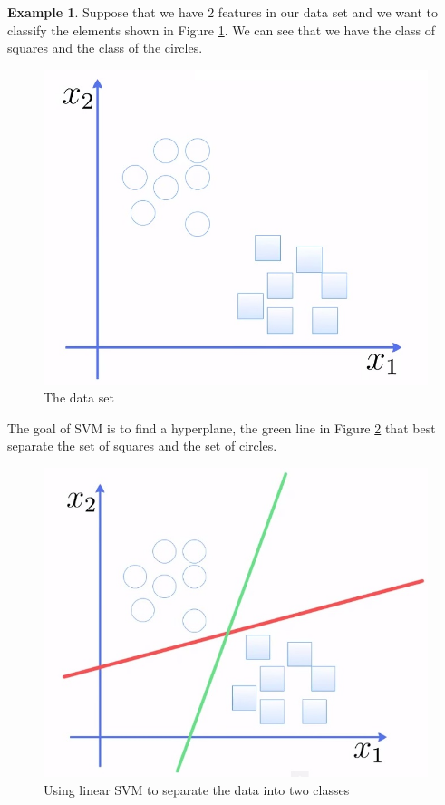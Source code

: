 \documentclass[11pt,oneside,reqno]{amsart}
\theoremstyle{definition}
\theoremstyle{definition}
\newtheorem{example}[theorem]{Example}
\theoremstyle{remark}
\numberwithin{equation}{section}
\numberwithin{equation}{section}
\begin{document}
\begin{example}
Suppose that we have 2 features in our data set and we want to classify the elements shown in Figure \ref{SVM_1}. We can see that we have the class of squares and the class of the circles.
\begin{figure}[H]
  \centering
   {\includegraphics[scale=0.2]{SVM_1}
   \caption{The data set}
  \label{SVM_1}}
\end{figure}
The goal of SVM is to find a hyperplane, the green line in Figure \ref{SVM_2} that best separate the set of squares and the set of circles.
\begin{figure}[H]
  \centering
   {\includegraphics[scale=0.2]{SVM_2}
   \caption{Using linear SVM to separate the data into two classes}
  \label{SVM_2}}
\end{figure}
\end{example}
\end{document}
